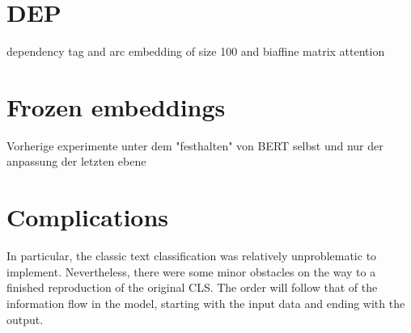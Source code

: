 \color{ForestGreen}
\section{DEP}
dependency  tag and arc embedding of size 100 and biaffine matrix attention 
\section{Frozen embeddings}
Vorherige experimente unter dem "festhalten" von BERT selbst und nur der anpassung der letzten ebene
\color{black}
\section{Complications}
In particular, the classic text classification was relatively unproblematic to implement. Nevertheless, there were some minor obstacles on the way to a finished reproduction of the original CLS. The order will follow that of the information flow in the model, starting with the input data and ending with the output.

